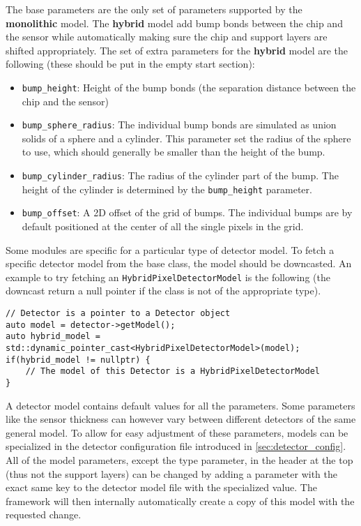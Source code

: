 The base parameters are the only set of parameters supported by the \textbf{monolithic} model. The \textbf{hybrid} model add bump bonds between the chip and the sensor while automatically making sure the chip and support layers are shifted appropriately. The set of extra parameters for the \textbf{hybrid} model are the following (these should be put in the empty start section):
\begin{itemize}
\item \texttt{bump\_height}: Height of the bump bonds (the separation distance between the chip and the sensor)
\item \texttt{bump\_sphere\_radius}: The individual bump bonds are simulated as union solids of a sphere and a cylinder. This parameter set the radius of the sphere to use, which should generally be smaller than the height of the bump.
\item \texttt{bump\_cylinder\_radius}: The radius of the cylinder part of the bump. The height of the cylinder is determined by the \texttt{bump\_height} parameter.
\item \texttt{bump\_offset}: A 2D offset of the grid of bumps. The individual bumps are by default positioned at the center of all the single pixels in the grid.
\end{itemize}

Some modules are specific for a particular type of detector model. To fetch a specific detector model from the base class, the model should be downcasted. An example to try fetching an \texttt{HybridPixelDetectorModel} is the following (the downcast return a null pointer if the class is not of the appropriate type).
\begin{verbatim}
// Detector is a pointer to a Detector object
auto model = detector->getModel();
auto hybrid_model = std::dynamic_pointer_cast<HybridPixelDetectorModel>(model);
if(hybrid_model != nullptr) {
    // The model of this Detector is a HybridPixelDetectorModel
}
\end{verbatim}

A detector model contains default values for all the parameters. Some parameters like the sensor thickness can however vary between different detectors of the same general model. To allow for easy adjustment of these parameters, models can be specialized in the detector configuration file introduced in \ref{sec:detector_config}. All of the model parameters, except the type parameter, in the header at the top (thus not the support layers) can be changed by adding a parameter with the exact same key to the detector model file with the specialized value. The framework will then internally automatically create a copy of this model with the requested change. 

